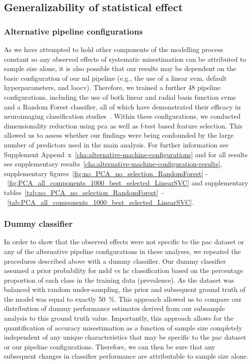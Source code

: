 \documentclass[12pt,a4paper]{article}
\begin{document}
    \subsection{Generalizability of statistical effect}

    \subsubsection{Alternative pipeline configurations}
    As we have attempted to hold other components of the modelling process constant so any observed effects of systematic misestimation can be attributed to sample size alone, it is also possible that our results may be dependent on the basic configuration of our \ac{ml} pipeline (e.g., the use of a linear \ac{svm}, default hyperparameters, and \ac{loocv}). Therefore, we trained a further \num{48} pipeline configurations, including the use of both linear and radial basis function \acp{svm} and a Random Forest classifier, all of which have demonstrated their efficacy in neuroimaging classification studies~\cite{Kambeitz2017}. Within these configurations, we conducted dimensionality reduction using \ac{pca} as well as f-test based feature selection. This allowed us to assess whether our findings were being confounded by the large number of predictors used in the main analysis. For further information see Supplement Append~x~\ref{cha:alternative-machine-configurations} and for all results see supplementary results~\ref{cha:alternative-machine-configuration-results}, supplementary figures~\ref{fig:no_PCA_no_selection_RandomForest} -~\ref{fig:PCA_all_components_1000_best_selected_LinearSVC} and supplementary tables~\ref{tab:no_PCA_no_selection_RandomForest}~-~\ref{tab:PCA_all_components_1000_best_selected_LinearSVC}.

    \subsubsection{Dummy classifier}
In order to show that the observed effects were not specific to the \ac{pac} dataset or any of the alternative pipeline configurations in these analyses, we repeated the procedures described above with a dummy classifier. Our dummy classifier assumed a prior probability for \ac{mdd} vs \ac{hc} classification based on the percentage proportion of each class in the training data (prevalence). As the dataset was balanced with random under-sampling, the prior and subsequent ground truth of the model was equal to exactly \SI{50}{\percent}. This approach allowed us to compare our distribution of dummy performance estimates derived from our subsample analysis to this ground truth value. Importantly, this approach allows for the quantification of accuracy misestimation as a function of sample size completely independent of any unique characteristics that may be specific to the \ac{pac} dataset or our pipeline configurations. Therefore, we can then be sure that any subsequent changes in classifier performance are attributable to sample size alone.
\end{document}
